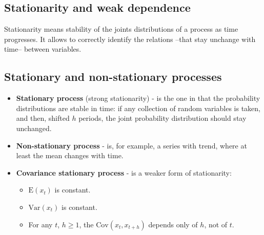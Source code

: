 \documentclass[10pt, a4paper, landscape]{extarticle}
\newcommand{\E}{\mathrm{E}}
\newcommand{\Var}{\mathrm{Var}}
\newcommand{\Cov}{\mathrm{Cov}}
\begin{document}
\begin{multicols}{3}
\section*{Stationarity and weak dependence}
	Stationarity means stability of the joints distributions of a process as time progresses. It allows to correctly identify the relations --that stay unchange with time-- between variables.
	\subsection*{Stationary and non-stationary processes}
		\begin{itemize}[leftmargin=*]
			\item \textbf{Stationary process} (strong stationarity) - is the one in that the probability distributions are stable in time: if any collection of random variables is taken, and then, shifted $h$ periods, the joint probability distribution should stay unchanged.
\columnbreak
			\item \textbf{Non-stationary process} - is, for example, a series with trend, where at least the mean changes with time.
			\item \textbf{Covariance stationary process} - is a weaker form of stationarity:
			\begin{itemize}[leftmargin=*]
				\item $\E(x_t)$ is constant.
				\item $\Var(x_t)$ is constant.
				\item For any $t$,  $h \geq 1$, the $\Cov(x_t, x_{t+h})$ depends only of $h$, not of $t$.
			\end{itemize}
		\end{itemize}

\end{multicols}
\end{document}
